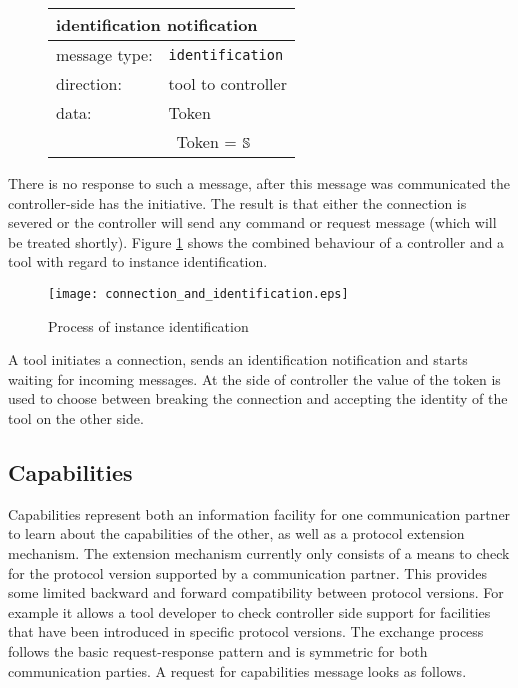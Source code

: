 \documentclass{article}
\newcommand{\msg}[1]{\texttt{#1}}
\newcommand{\String}{\ensuremath \mathbb{S}\xspace}
\begin{document}
   \begin{figure}[H]
    \begin{center}
     \vspace{-0.3cm}
     \begin{tabular}{|ll|}
      \hline
       \multicolumn{2}{|l|}{\textbf{identification notification}} \\
      \hline
       message type:    & \msg{identification} \\
      \hline
       direction:       & tool to controller \\
       data:            & Token \\
                        & \ Token = $\String$ \\
      \hline
     \end{tabular}
     \vspace{-0.5cm}
    \end{center}
   \end{figure}

   \noindent There is no response to such a message, after this message was
   communicated the controller-side has the initiative. The result is that
   either the connection is severed or the controller will send any command or
   request message (which will be treated shortly). Figure
   \ref{fig::identification} shows the combined behaviour of a controller and a
   tool with regard to instance identification.

   \begin{figure}[H]
    \begin{center}
     \texttt{[image: connection\_and\_identification.eps]}
    \end{center}
    \vspace{-0.5cm}
    \caption{Process of instance identification}
    \vspace{-0.2cm}
    \label{fig::identification}
   \end{figure}
\enlargethispage{1cm}
   \noindent A tool initiates a connection, sends an identification
   notification and starts waiting for incoming messages.  At the side of
   controller the value of the token is used to choose between breaking the
   connection and accepting the identity of the tool on the other side.
\pagebreak
  \subsection{Capabilities} \label{ss:capabilities}

   Capabilities represent both an information facility for one communication
   partner to learn about the capabilities of the other, as well as a protocol
   extension mechanism. The extension mechanism currently only consists of a
   means to check for the protocol version supported by a communication
   partner. This provides some limited backward and forward compatibility
   between protocol versions.  For example it allows a tool developer to check
   controller side support for facilities that have been introduced in specific
   protocol versions. The exchange process follows the basic request-response
   pattern and is symmetric for both communication parties. A request for
   capabilities message looks as follows.
   
\end{document}
